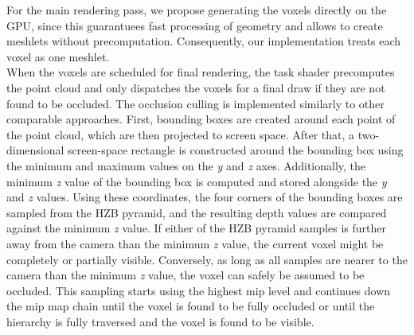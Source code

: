 \documentclass[conference]{IEEEtran}
\begin{document}
\noindent
For the main rendering pass, we propose generating the voxels directly on the \ac{GPU}, since this 
guarantuees fast processing of geometry and allows to create meshlets without precomputation.
Consequently, our implementation treats each voxel as one meshlet. \\

\noindent
When the voxels are scheduled for final rendering, the task shader precomputes the point cloud 
and only dispatches the voxels for a final draw if they are not found to be occluded. The occlusion 
culling is implemented similarly to other comparable approaches. First, bounding boxes are created 
around each point of the point cloud, which are then projected to screen space. After that, 
a two-dimensional screen-space rectangle is constructed around the bounding box using the minimum 
and maximum values on the \emph{y} and \emph{z} axes. Additionally, the minimum \emph{z} value of 
the bounding box is computed and stored alongside the \emph{y} and \emph{z} values. Using these 
coordinates, the four corners of the bounding boxes are sampled from the \ac{HZB} pyramid, and the 
resulting depth values are compared against the minimum \emph{z} value. If either of the 
\ac{HZB} pyramid samples is further away from the camera than the minimum \emph{z} value, the current 
voxel might be completely or partially visible. Conversely, as long as all samples are nearer to 
the camera than the minimum \emph{z} value, the voxel can safely be assumed to be occluded. This 
sampling starts using the highest mip level and continues down the mip map chain until the voxel is 
found to be fully occluded or until the hierarchy is fully traversed and the voxel is found to be 
visible. 
\end{document}
